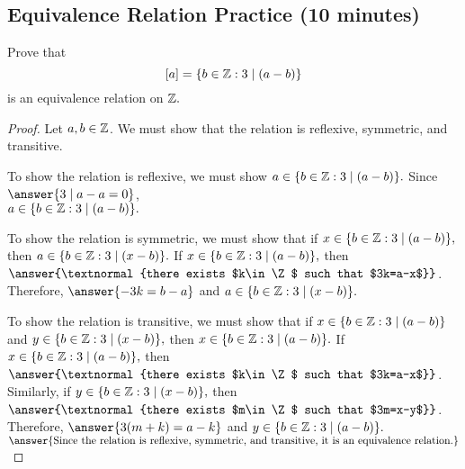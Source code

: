 \documentclass{../ximera}
\begin{document}
\subsection{Equivalence Relation Practice (10 minutes)}

\begin{br}
    Prove that \[[a]=\{b\in\mathbb Z: 3\mid(a-b)\}\] is an equivalence relation on $\mathbb Z.$
  \end{br}
  
  \begin{proof}
    Let $a,b\in\mathbb Z$. We must show that the relation is reflexive, symmetric, and transitive.
  
     To show the relation is reflexive, we must show $a\in \{b\in\mathbb Z: 3\mid(a-b)\}.$ Since $\answer{3\mid a-a=0}$,\\
     $a\in \{b\in\mathbb Z: 3\mid(a-b)\}.$
  
     To show the relation is symmetric, we must show that if $x\in \{b\in\mathbb Z: 3\mid(a-b)\},$ then $a\in \{b\in\mathbb Z: 3\mid(x-b)\}.$ If $x\in \{b\in\mathbb Z: 3\mid(a-b)\},$ then $\answer{\textnormal{there exists $k\in\Z$ such that $3k=a-x$}}$. Therefore, $\answer{-3k=b-a}$
     and $a\in \{b\in\mathbb Z: 3\mid(x-b)\}.$
  
     To show the relation is transitive, we must show that if $x\in \{b\in\mathbb Z: 3\mid(a-b)\}$ and $y\in \{b\in\mathbb Z: 3\mid(x-b)\},$ then $x\in \{b\in\mathbb Z: 3\mid(a-b)\}.$ If $x\in \{b\in\mathbb Z: 3\mid(a-b)\},$ then $\answer{\textnormal{there exists $k\in\Z$ such that $3k=a-x$}}$. 
     Similarly, if $y\in \{b\in\mathbb Z: 3\mid(x-b)\},$ then $\answer{\textnormal{there exists $m\in\Z$ such that $3m=x-y$}}$.
     Therefore, $\answer{3(m+k)=a-k}$
     and $y\in \{b\in\mathbb Z: 3\mid(a-b)\}.$ $\answer{\textnormal{Since the relation is reflexive, symmetric, and transitive, it is an equivalence relation.}}$
  \end{proof}

\end{document}
